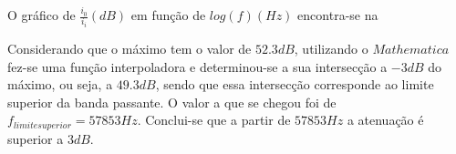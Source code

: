 \documentclass[%
  reprint,
  nofootinbib,
  amsmath,amssymb,
  aps,
  10pt,
  a4paper
]{revtex4-1}
\begin{document}

O gráfico de $\frac{i_0}{i_i} (dB)$ em função de $log(f) (Hz)$ encontra-se na  


Considerando que o máximo tem o valor de $52.3 dB$, utilizando o $Mathematica$ fez-se uma função interpoladora e determinou-se a sua intersecção a $-3 dB$ do máximo, ou seja, a $49.3 dB$, sendo que essa intersecção corresponde ao limite superior da banda passante. O valor a que se chegou foi de $f_{limite superior}=57853Hz$. Conclui-se que a partir de $57853Hz$ a atenuação é superior a $3dB$.
\end{document}
